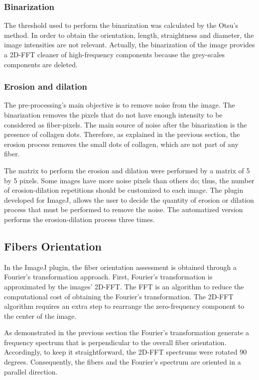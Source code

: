 \documentclass[12pt,a4paper]{article}
\begin{document}
\subsubsection{Binarization}
The threshold used to perform the binarization was calculated by the Otsu’s method. In order to obtain the orientation, length, straightness and diameter, the image intensities are not relevant. Actually, the binarization of the image provides a 2D-FFT cleaner of high-frequency components because the grey-scales components are deleted.
\subsubsection{Erosion and dilation}
The pre-processing's main objective is to remove noise from the image. The binarization removes the pixels that do not have enough intensity to be considered as fiber-pixels. The main source of noise after the binarization is the presence of collagen dots. Therefore, as explained in the previous section, the erosion process removes the small dots of collagen, which are not part of any fiber.

The matrix to perform the erosion and dilation were performed by a matrix of 5 by 5 pixels. Some images have more noise pixels than others do; thus, the number of erosion-dilation repetitions should be customized to each image. The plugin developed for ImageJ, allows the user to decide the quantity of erosion or dilation process that must be performed to remove the noise. The automatized version performs the erosion-dilation process three times.
\subsection{Fibers Orientation}

In the ImageJ plugin, the fiber orientation assessment is obtained through a Fourier’s transformation approach. First, Fourier's transformation is approximated by the images' 2D-FFT. The FFT is an algorithm to reduce the computational cost of obtaining the Fourier’s transformation. The 2D-FFT algorithm requires an extra step to rearrange the zero-frequency component to the center of the image.

As demonstrated in the previous section the Fourier's transformation generate a frequency spectrum that is perpendicular to the overall fiber orientation. Accordingly, to keep it straightforward, the 2D-FFT spectrums were rotated 90 degrees. Consequently, the fibers and the Fourier’s spectrum are oriented in a parallel direction.
\end{document}
